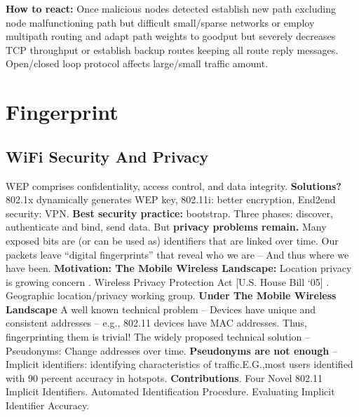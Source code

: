 \documentclass[9pt]{extarticle}
\begin{document}
\begin{multicols}{2}
\textbf{How to react:} Once malicious nodes detected establish new path excluding node malfunctioning path but difficult small/sparse networks or employ multipath routing and adapt path weights to goodput but severely decreases TCP throughput or establish backup routes keeping all route reply messages. Open/closed loop protocol affects large/small traffic amount.

\section{Fingerprint}
\subsection{WiFi Security And Privacy}
WEP comprises confidentiality, access control, and data integrity. \textbf{Solutions?} 802.1x dynamically generates WEP key, 802.11i: better encryption, End2end security: VPN. \textbf{Best security practice:} bootstrap. Three phases: discover, authenticate and bind, send data. But \textbf{privacy problems remain.} Many exposed bits are (or can be used as) identifiers that are linked over time. Our packets leave “digital fingerprints” that reveal who we are -- And thus where we have been. \textbf{Motivation: The Mobile Wireless Landscape:} Location privacy is growing concern
. Wireless Privacy Protection Act [U.S. House Bill ‘05]
. Geographic location/privacy working group. \textbf{Under The Mobile Wireless Landscape} A well known technical problem
– Devices have unique and consistent addresses – e.g., 802.11 devices have MAC addresses. Thus, fingerprinting them is trivial! The widely proposed technical solution – Pseudonyms: Change addresses over time. \textbf{Pseudonyms are not enough}
– Implicit identifiers: identifying characteristics of traffic.E.G.,most users identified with 90 percent accuracy in hotspots. \textbf{Contributions}. Four Novel 802.11 Implicit Identifiers. Automated Identification Procedure. Evaluating Implicit Identifier Accuracy.


\end{multicols}
\end{document}
